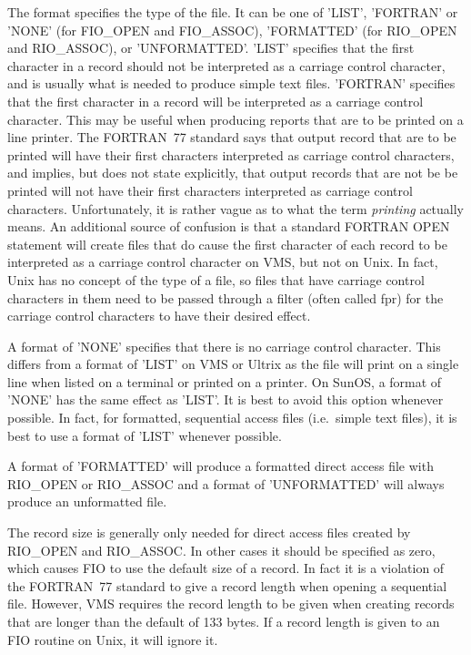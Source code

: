 \documentclass[twoside,11pt,nolof]{starlink}
\begin{document}
The format specifies the type of the file. It can be one of 'LIST', 'FORTRAN'
or 'NONE' (for FIO\_OPEN and FIO\_ASSOC), 'FORMATTED' (for RIO\_OPEN and
RIO\_ASSOC), or 'UNFORMATTED'. 'LIST' specifies that the first character in a
record should not be interpreted as a carriage control character, and is
usually what is needed to produce simple text files. 'FORTRAN' specifies that
the first character in a record will be interpreted as a carriage control
character. This may be useful when producing reports that are to be printed on
a line printer. The FORTRAN~77 standard says that output record that are to be
printed will have their first characters interpreted as carriage control
characters, and implies, but does not state explicitly, that output records that
are not be be printed will not have their first characters interpreted as
carriage control characters. Unfortunately, it is rather vague as to what the
term \emph{printing\/} actually means. An additional source of confusion is that
a standard FORTRAN OPEN statement will create files that do cause the first
character of each record to be interpreted as a carriage control character on
VMS, but not on Unix. In fact, Unix has no concept of the type of a file, so
files that have carriage control characters in them need to be passed through a
filter (often called fpr) for the carriage control characters to have their
desired effect.

A format of 'NONE' specifies that there is no carriage control character. This
differs from a format of 'LIST' on VMS or Ultrix as the file will print on a
single line when listed on a terminal or printed on a printer. On SunOS, a
format of 'NONE' has the same effect as 'LIST'. It is best to avoid this option
whenever possible. In fact, for formatted, sequential access files (i.e.\
simple text files), it is best to use a format of 'LIST' whenever possible.

A format of 'FORMATTED' will produce a formatted direct access file with
RIO\_OPEN or RIO\_ASSOC and a format of 'UNFORMATTED' will always produce an
unformatted file.

The record size is generally only needed for direct access files created by
RIO\_OPEN and RIO\_ASSOC. In other cases it should be specified as zero, which
causes FIO to use the default size of a record. In fact it is a violation of
the FORTRAN~77 standard to give a record length when opening a sequential file.
However, VMS requires the record length to be given when creating records that
are longer than the default of 133 bytes. If a record length is given to an FIO
routine on Unix, it will ignore it.
\end{document}
